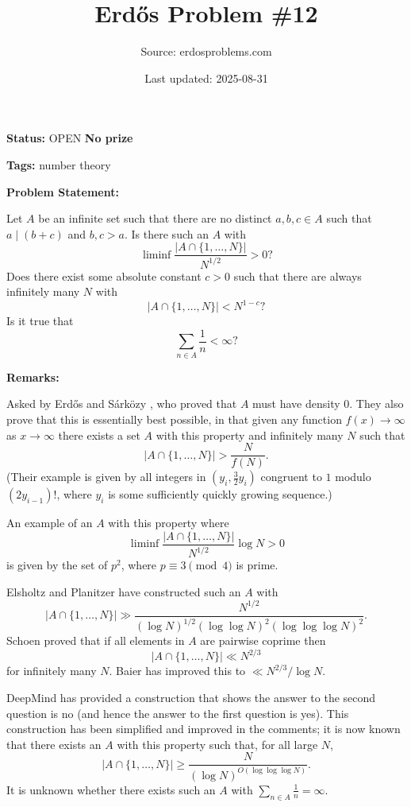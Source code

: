 \documentclass{article}
\title{Erd\H{o}s Problem \#12}
\date{Last updated: 2025-08-31}
\author{Source: erdosproblems.com}
\begin{document}
\maketitle

\noindent\textbf{Status:} OPEN \quad \textbf{No prize}

\noindent\textbf{Tags:} number theory

\medskip
\noindent\textbf{Problem Statement:}

Let $A$ be an infinite set such that there are no distinct $a,b,c\in A$ such that $a\mid (b+c)$ and $b,c>a$. Is there such an $A$ with\[\liminf \frac{\lvert A\cap\{1,\ldots,N\}\rvert}{N^{1/2}}>0?\]Does there exist some absolute constant $c>0$ such that there are always infinitely many $N$ with\[\lvert A\cap\{1,\ldots,N\}\rvert<N^{1-c}?\]Is it true that\[\sum_{n\in A}\frac{1}{n}<\infty?\]

\bigskip
\noindent\textbf{Remarks:}

Asked by Erd\H{o}s and S\'{a}rk\"{o}zy \cite{ErSa70}, who proved that $A$ must have density $0$. They also prove that this is essentially best possible, in that given any function $f(x)\to \infty$ as $x\to \infty$ there exists a set $A$ with this property and infinitely many $N$ such that\[\lvert A\cap\{1,\ldots,N\}\rvert>\frac{N}{f(N)}.\](Their example is given by all integers in $(y_i,\frac{3}{2}y_i)$ congruent to $1$ modulo $(2y_{i-1})!$, where $y_i$ is some sufficiently quickly growing sequence.)

An example of an $A$ with this property where\[\liminf \frac{\lvert A\cap\{1,\ldots,N\}\rvert}{N^{1/2}}\log N>0\]is given by the set of $p^2$, where $p\equiv 3\pmod{4}$ is prime.

Elsholtz and Planitzer \cite{ElPl17} have constructed such an $A$ with\[\lvert A\cap\{1,\ldots,N\}\rvert\gg \frac{N^{1/2}}{(\log N)^{1/2}(\log\log N)^2(\log\log\log N)^2}.\]Schoen \cite{Sc01} proved that if all elements in $A$ are pairwise coprime then\[\lvert A\cap\{1,\ldots,N\}\rvert \ll N^{2/3}\]for infinitely many $N$. Baier \cite{Ba04} has improved this to $\ll N^{2/3}/\log N$.

DeepMind has provided a construction that shows the answer to the second question is no (and hence the answer to the first question is yes). This construction has been simplified and improved in the comments; it is now known that there exists an $A$ with this property such that, for all large $N$,\[\lvert A\cap \{1,\ldots,N\}\rvert \geq \frac{N}{(\log N)^{O(\log\log\log N)}}.\]It is unknown whether there exists such an $A$ with $\sum_{n\in A}\frac{1}{n}=\infty$.
\end{document}
